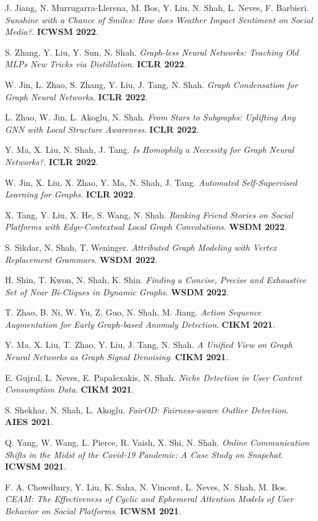 \documentclass{article}
\begin{document}
\begin{etaremune}[itemsep=1pt,parsep=0pt]
\item J. Jiang, N. Murrugarra-Llerena, M. Bos, Y. Liu, N. Shah, L. Neves, F. Barbieri. \emph{Sunshine with a Chance of Smiles: How does Weather Impact Sentiment on Social Media?}. \textbf{ICWSM 2022}.
\item S. Zhang, Y. Liu, Y. Sun, N. Shah. \emph{Graph-less Neural Networks: Teaching Old MLPs New Tricks via Distillation}. \textbf{ICLR 2022}.
\item W. Jin, L. Zhao, S. Zhang, Y. Liu, J. Tang, N. Shah. \emph{Graph Condensation for Graph Neural Networks}. \textbf{ICLR 2022}.
\item L. Zhao, W. Jin, L. Akoglu, N. Shah. \emph{From Stars to Subgraphs: Uplifting Any GNN with Local Structure Awareness}. \textbf{ICLR 2022}.
\item Y. Ma, X. Liu, N. Shah, J. Tang. \emph{Is Homophily a Necessity for Graph Neural Networks?}. \textbf{ICLR 2022}.
\item W. Jin, X. Liu, X. Zhao, Y. Ma, N. Shah, J. Tang. \emph{Automated Self-Supervised Learning for Graphs}. \textbf{ICLR 2022}.
\item X. Tang, Y. Liu, X. He, S. Wang, N. Shah. \emph{Ranking Friend Stories on Social Platforms with Edge-Contextual Local Graph Convolutions}. \textbf{WSDM 2022}.
\item S. Sikdar, N. Shah, T. Weninger. \emph{Attributed Graph Modeling with Vertex Replacement Grammars}. \textbf{WSDM 2022}.
\item H. Shin, T. Kwon, N. Shah, K. Shin. \emph{Finding a Concise, Precise and Exhaustive Set of Near Bi-Cliques in Dynamic Graphs}. \textbf{WSDM 2022}.
\item T. Zhao, B. Ni, W. Yu, Z. Guo, N. Shah, M. Jiang. \emph{Action Sequence Augmentation for Early Graph-based Anomaly Detection}. \textbf{CIKM 2021}.
\item Y. Ma, X. Liu, T. Zhao, Y. Liu, J. Tang, N. Shah. \emph{A Unified View on Graph Neural Networks as Graph Signal Denoising}. \textbf{CIKM 2021}.
\item E. Gujral, L. Neves, E. Papalexakis, N. Shah. \emph{Niche Detection in User Content Consumption Data}. \textbf{CIKM 2021}.
\item S. Shekhar, N. Shah, L. Akoglu. \emph{FairOD: Fairness-aware Outlier Detection}. \textbf{AIES 2021}.
\item Q. Yang, W. Wang, L. Pierce, R. Vaish, X. Shi, N. Shah. \emph{Online Communication Shifts in the Midst of the Covid-19 Pandemic: A Case Study on Snapchat}. \textbf{ICWSM 2021}.
\item F. A. Chowdhury, Y. Liu, K. Saha, N. Vincent, L. Neves, N. Shah, M. Bos. \emph{CEAM: The Effectiveness of Cyclic and Ephemeral Attention Models of User Behavior on Social Platforms}. \textbf{ICWSM 2021}.

\end{etaremune}
\end{document}
